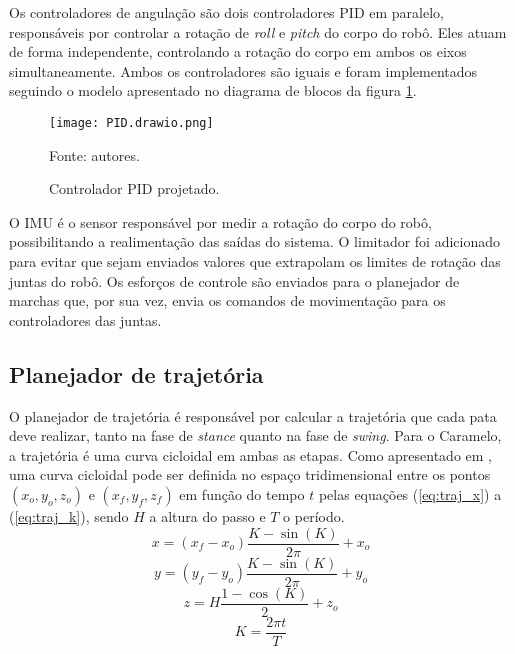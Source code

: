 \documentclass[conference]{IEEEtran}
\begin{document}
Os controladores de angulação são dois controladores PID em paralelo, responsáveis por controlar a rotação de \textit{roll} e \textit{pitch} do corpo do robô. Eles atuam de forma independente, controlando a rotação do corpo em ambos os eixos simultaneamente. Ambos os controladores são iguais e foram implementados seguindo o modelo apresentado no diagrama de blocos da figura \ref{fig:pid}.
\begin{figure}[htbp]
  \centering
  \texttt{[image: PID.drawio.png]}
  \caption{Controlador PID projetado.}
  Fonte: autores.
  \label{fig:pid}
\end{figure}

O IMU é o sensor responsável por medir a rotação do corpo do robô, possibilitando a realimentação das saídas do sistema. O limitador foi adicionado para evitar que sejam enviados valores que extrapolam os limites de rotação das juntas do robô. Os esforços de controle são enviados para o planejador de marchas que, por sua vez, envia os comandos de movimentação para os controladores das juntas.

\subsection{Planejador de trajetória}

O planejador de trajetória é responsável por calcular a trajetória que cada pata deve realizar, tanto na fase de \textit{stance} quanto na fase de \textit{swing}. Para o Caramelo, a trajetória é uma curva cicloidal em ambas as etapas. Como apresentado em \cite{Shi2021}, uma curva cicloidal pode ser definida no espaço tridimensional entre os pontos $(x_o, y_o, z_o)$ e $(x_f, y_f, z_f)$ em função do tempo $t$ pelas equações (\ref{eq:traj_x}) a (\ref{eq:traj_k}), sendo $H$ a altura do passo e $T$ o período.
\begin{equation}
  x = (x_f - x_o) \frac{K - \sin{(K)}}{2 \pi} + x_o
  \label{eq:traj_x}
\end{equation}
\begin{equation}
  y = (y_f - y_o) \frac{K - \sin{(K)}}{2 \pi} + y_o
  \label{eq:traj_y}
\end{equation}
\begin{equation}
  z = H \frac{1 - \cos{(K)}}{2} + z_o
  \label{eq:traj_z}
\end{equation}
\begin{equation}
  K = \frac{2 \pi t}{T}
  \label{eq:traj_k}
\end{equation}
\end{document}
